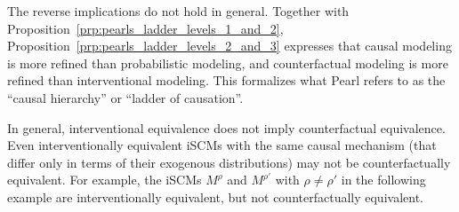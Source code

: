 The reverse implications do not hold in general. 
Together with Proposition~\ref{prp:pearls_ladder_levels_1_and_2}, Proposition~\ref{prp:pearls_ladder_levels_2_and_3} 
expresses that causal modeling is more refined than 
probabilistic modeling, and counterfactual modeling is more refined than interventional modeling.
This formalizes what Pearl refers to as the ``causal hierarchy'' or ``ladder of causation''.

In general, interventional equivalence does not imply counterfactual equivalence. Even interventionally equivalent iSCMs with the same causal mechanism (that differ only in terms of their exogenous distributions) may not be counterfactually equivalent. For example, the iSCMs $M^{\rho}$ and $M^{\rho'}$ with $\rho\neq\rho'$ in the following example are interventionally equivalent, but not counterfactually equivalent.
